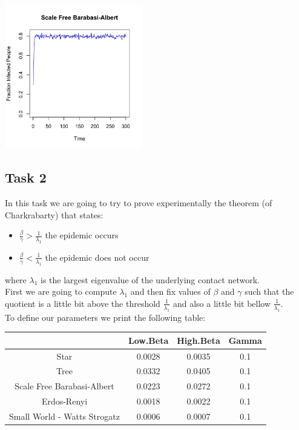 \documentclass{article}
\begin{document}
\begin{center}
    \includegraphics[width=6cm]{barabasi_albert_4.jpeg}
    
\end{center}

\newpage

\subsection{Task 2}

\noindent In this task we are going to try to prove experimentally the theorem (of Charkrabarty) that states:\\

\begin{itemize}
  \item $\frac{\beta}{\gamma} > \frac{1}{\lambda_{1}}$ the epidemic occurs
  \item $\frac{\beta}{\gamma} < \frac{1}{\lambda_{1}}$ the epidemic does not occur\\
\end{itemize}

\noindent where $\lambda_{1}$ is the largest eigenvalue of the underlying contact network.\\

\noindent First we are going to compute $\lambda_{1}$ and then fix values of $\beta$ and $\gamma$ such that the quotient is a little bit above the threshold $\frac{1}{\lambda_{1}}$ and also a little bit bellow $\frac{1}{\lambda_{1}}$.\\

\noindent To define our parameters we print the following table:\\

\begin{center}
 \begin{tabular}{||c c c c||} 
 \hline
 & Low.Beta & High.Beta & Gamma \\ [0.5ex] 
 \hline\hline
 Star & 0.0028 & 0.0035 & 0.1 \\ 
 \hline
 Tree & 0.0332 & 0.0405 & 0.1 \\
 \hline
 Scale Free Barabasi-Albert & 0.0223 & 0.0272 & 0.1 \\
 \hline
 Erdos-Renyi & 0.0018 & 0.0022 & 0.1 \\
 \hline
 Small World - Watts Strogatz & 0.0006 & 0.0007 & 0.1 \\
 \hline
 
 
\end{tabular}
\end{center}
\end{document}
